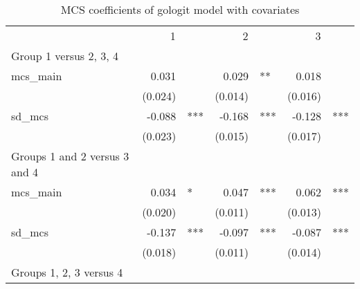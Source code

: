 \begin{table}[!h]
\caption{MCS coefficients of gologit model with covariates}
\centering
\begin{tabular}{lllllll}
\cline{1-7}
\multicolumn{1}{r}{} &
  \multicolumn{2}{c}{1} &
  \multicolumn{2}{c}{2} &
  \multicolumn{2}{c}{3} \\
\cline{1-7}
\multicolumn{1}{l}{\hspace*{-1em}Group 1 versus 2, 3, 4 } \\
\multicolumn{1}{l}{mcs\_main} &
  \multicolumn{1}{r}{0.031} &
  \multicolumn{1}{l}{} &
  \multicolumn{1}{r}{0.029} &
  \multicolumn{1}{l}{**} &
  \multicolumn{1}{r}{0.018} &
  \multicolumn{1}{l}{} \\
\multicolumn{1}{l}{} &
  \multicolumn{1}{r}{(0.024)} &
  \multicolumn{1}{l}{} &
  \multicolumn{1}{r}{(0.014)} &
  \multicolumn{1}{l}{} &
  \multicolumn{1}{r}{(0.016)} &
  \multicolumn{1}{l}{} \\
\multicolumn{1}{l}{sd\_mcs} &
  \multicolumn{1}{r}{-0.088} &
  \multicolumn{1}{l}{***} &
  \multicolumn{1}{r}{-0.168} &
  \multicolumn{1}{l}{***} &
  \multicolumn{1}{r}{-0.128} &
  \multicolumn{1}{l}{***} \\
\multicolumn{1}{l}{} &
  \multicolumn{1}{r}{(0.023)} &
  \multicolumn{1}{l}{} &
  \multicolumn{1}{r}{(0.015)} &
  \multicolumn{1}{l}{} &
  \multicolumn{1}{r}{(0.017)} &
  \multicolumn{1}{l}{} \\
\multicolumn{1}{l}{\hspace*{-1em}Groups 1 and 2 versus 3 and 4 } \\
\multicolumn{1}{l}{mcs\_main} &
  \multicolumn{1}{r}{0.034} &
  \multicolumn{1}{l}{*} &
  \multicolumn{1}{r}{0.047} &
  \multicolumn{1}{l}{***} &
  \multicolumn{1}{r}{0.062} &
  \multicolumn{1}{l}{***} \\
\multicolumn{1}{l}{} &
  \multicolumn{1}{r}{(0.020)} &
  \multicolumn{1}{l}{} &
  \multicolumn{1}{r}{(0.011)} &
  \multicolumn{1}{l}{} &
  \multicolumn{1}{r}{(0.013)} &
  \multicolumn{1}{l}{} \\
\multicolumn{1}{l}{sd\_mcs} &
  \multicolumn{1}{r}{-0.137} &
  \multicolumn{1}{l}{***} &
  \multicolumn{1}{r}{-0.097} &
  \multicolumn{1}{l}{***} &
  \multicolumn{1}{r}{-0.087} &
  \multicolumn{1}{l}{***} \\
\multicolumn{1}{l}{} &
  \multicolumn{1}{r}{(0.018)} &
  \multicolumn{1}{l}{} &
  \multicolumn{1}{r}{(0.011)} &
  \multicolumn{1}{l}{} &
  \multicolumn{1}{r}{(0.014)} &
  \multicolumn{1}{l}{} \\
\multicolumn{1}{l}{\hspace*{-1em}Groups 1, 2, 3 versus 4} \\

\end{tabular}
\end{table}
